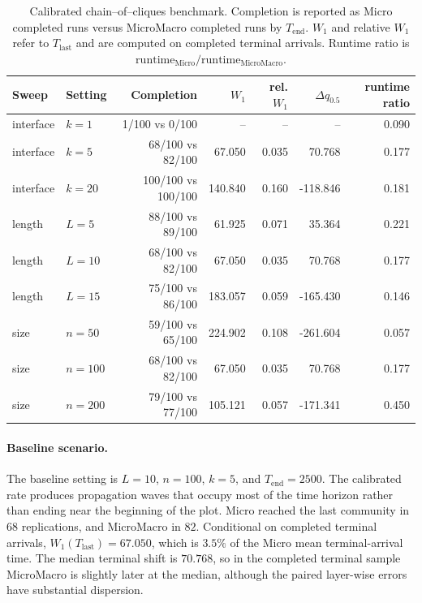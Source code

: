 \documentclass{article}
\begin{document}
\begin{table}[t]
    \centering
    \begin{tabular}{llrrrrr}
        \hline
        Sweep & Setting & Completion & \(W_1\) & rel. \(W_1\) & \(\Delta q_{0.5}\) & runtime ratio \\
        \hline
        interface & \(k=1\)  & 1/100 vs 0/100     & --     & --    & --       & 0.090 \\
        interface & \(k=5\)  & 68/100 vs 82/100   & 67.050 & 0.035 & 70.768   & 0.177 \\
        interface & \(k=20\) & 100/100 vs 100/100 & 140.840 & 0.160 & -118.846 & 0.181 \\
        length & \(L=5\)    & 88/100 vs 89/100   & 61.925 & 0.071 & 35.364   & 0.221 \\
        length & \(L=10\)   & 68/100 vs 82/100   & 67.050 & 0.035 & 70.768   & 0.177 \\
        length & \(L=15\)   & 75/100 vs 86/100   & 183.057 & 0.059 & -165.430 & 0.146 \\
        size & \(n=50\)     & 59/100 vs 65/100   & 224.902 & 0.108 & -261.604 & 0.057 \\
        size & \(n=100\)    & 68/100 vs 82/100   & 67.050 & 0.035 & 70.768   & 0.177 \\
        size & \(n=200\)    & 79/100 vs 77/100   & 105.121 & 0.057 & -171.341 & 0.450 \\
        \hline
    \end{tabular}
    \caption{Calibrated chain--of--cliques benchmark. Completion is reported as Micro completed runs versus MicroMacro completed runs by \(T_{\mathrm{end}}\). \(W_1\) and relative \(W_1\) refer to \(T_{\mathrm{last}}\) and are computed on completed terminal arrivals. Runtime ratio is \(\mathrm{runtime}_{\mathrm{Micro}}/\mathrm{runtime}_{\mathrm{MicroMacro}}\).}
    \label{tab:chain_cliques_v2_summary}
\end{table}

\paragraph{Baseline scenario.}
The baseline setting is \(L=10\), \(n=100\), \(k=5\), and \(T_{\mathrm{end}}=2500\). The calibrated rate produces propagation waves that occupy most of the time horizon rather than ending near the beginning of the plot. Micro reached the last community in \(68\) replications, and MicroMacro in \(82\). Conditional on completed terminal arrivals, \(W_1(T_{\mathrm{last}})=67.050\), which is \(3.5\%\) of the Micro mean terminal-arrival time. The median terminal shift is \(70.768\), so in the completed terminal sample MicroMacro is slightly later at the median, although the paired layer-wise errors have substantial dispersion.
\end{document}
